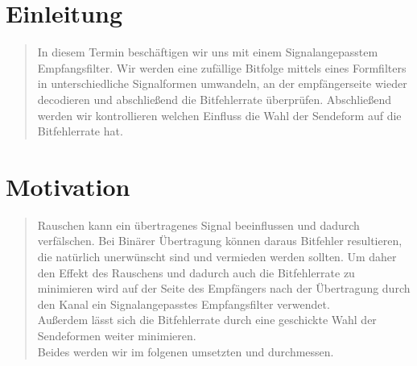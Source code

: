 \section{Einleitung}
\begin{quote}
	
	In diesem Termin beschäftigen wir uns mit einem Signalangepasstem Empfangsfilter. Wir werden eine zufällige Bitfolge
	mittels eines Formfilters in unterschiedliche Signalformen umwandeln, an der empfängerseite wieder decodieren und
	abschließend die Bitfehlerrate überprüfen. Abschließend werden wir kontrollieren welchen Einfluss die Wahl der
	Sendeform auf die Bitfehlerrate hat.


\end{quote}%

\section{Motivation}
\begin{quote}
	Rauschen kann ein übertragenes Signal beeinflussen und dadurch verfälschen. Bei Binärer Übertragung können daraus
	Bitfehler resultieren, die natürlich unerwünscht sind und vermieden werden sollten. Um daher den Effekt des Rauschens
	und dadurch auch die Bitfehlerrate zu minimieren wird auf der Seite des Empfängers nach der Übertragung
	durch den Kanal ein Signalangepasstes Empfangsfilter verwendet.\\
	Außerdem lässt sich die Bitfehlerrate durch eine geschickte Wahl der Sendeformen weiter minimieren.\\
	Beides werden wir im folgenen umsetzten und durchmessen. 
\end{quote} %



